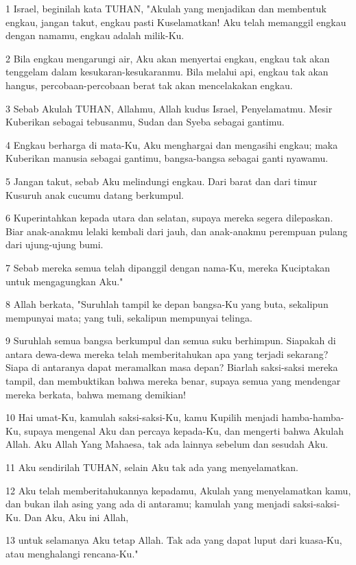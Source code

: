 \par 1 Israel, beginilah kata TUHAN, "Akulah yang menjadikan dan membentuk engkau, jangan takut, engkau pasti Kuselamatkan! Aku telah memanggil engkau dengan namamu, engkau adalah milik-Ku.
\par 2 Bila engkau mengarungi air, Aku akan menyertai engkau, engkau tak akan tenggelam dalam kesukaran-kesukaranmu. Bila melalui api, engkau tak akan hangus, percobaan-percobaan berat tak akan mencelakakan engkau.
\par 3 Sebab Akulah TUHAN, Allahmu, Allah kudus Israel, Penyelamatmu. Mesir Kuberikan sebagai tebusanmu, Sudan dan Syeba sebagai gantimu.
\par 4 Engkau berharga di mata-Ku, Aku menghargai dan mengasihi engkau; maka Kuberikan manusia sebagai gantimu, bangsa-bangsa sebagai ganti nyawamu.
\par 5 Jangan takut, sebab Aku melindungi engkau. Dari barat dan dari timur Kusuruh anak cucumu datang berkumpul.
\par 6 Kuperintahkan kepada utara dan selatan, supaya mereka segera dilepaskan. Biar anak-anakmu lelaki kembali dari jauh, dan anak-anakmu perempuan pulang dari ujung-ujung bumi.
\par 7 Sebab mereka semua telah dipanggil dengan nama-Ku, mereka Kuciptakan untuk mengagungkan Aku."
\par 8 Allah berkata, "Suruhlah tampil ke depan bangsa-Ku yang buta, sekalipun mempunyai mata; yang tuli, sekalipun mempunyai telinga.
\par 9 Suruhlah semua bangsa berkumpul dan semua suku berhimpun. Siapakah di antara dewa-dewa mereka telah memberitahukan apa yang terjadi sekarang? Siapa di antaranya dapat meramalkan masa depan? Biarlah saksi-saksi mereka tampil, dan membuktikan bahwa mereka benar, supaya semua yang mendengar mereka berkata, bahwa memang demikian!
\par 10 Hai umat-Ku, kamulah saksi-saksi-Ku, kamu Kupilih menjadi hamba-hamba-Ku, supaya mengenal Aku dan percaya kepada-Ku, dan mengerti bahwa Akulah Allah. Aku Allah Yang Mahaesa, tak ada lainnya sebelum dan sesudah Aku.
\par 11 Aku sendirilah TUHAN, selain Aku tak ada yang menyelamatkan.
\par 12 Aku telah memberitahukannya kepadamu, Akulah yang menyelamatkan kamu, dan bukan ilah asing yang ada di antaramu; kamulah yang menjadi saksi-saksi-Ku. Dan Aku, Aku ini Allah,
\par 13 untuk selamanya Aku tetap Allah. Tak ada yang dapat luput dari kuasa-Ku, atau menghalangi rencana-Ku."
